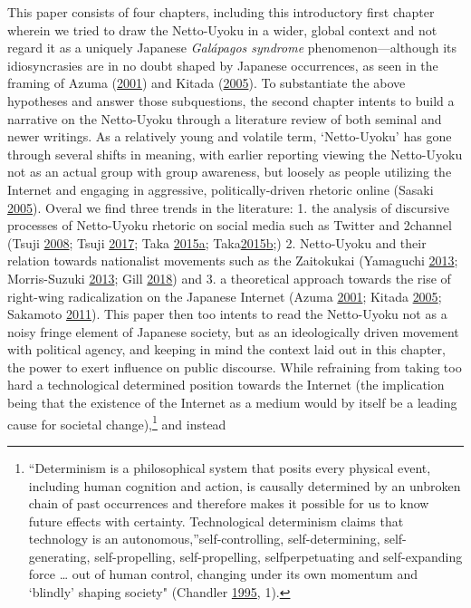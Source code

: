 \documentclass[10pt,british,A4paper,oneside]{memoir}
\begin{document}
This paper consists of four chapters, including this introductory first
chapter wherein we tried to draw the Netto-Uyoku in a wider, global
context and not regard it as a uniquely Japanese \emph{Galápagos
syndrome} phenomenon—although its idiosyncrasies are in no doubt shaped
by Japanese occurrences, as seen in the framing of Azuma
(\protect\hyperlink{ref-azuma_otaku:_2001}{2001}) and Kitada
(\protect\hyperlink{ref-kitada_eng:_2005}{2005}). To substantiate the above
hypotheses and answer those subquestions, the second chapter intents to
build a narrative on the Netto-Uyoku through a literature review of both
seminal and newer writings. As a relatively young and volatile term,
`Netto-Uyoku' has gone through several shifts in meaning, with earlier
reporting viewing the Netto-Uyoku not as an actual group with group
awareness, but loosely as people utilizing the Internet and engaging in
aggressive, politically-driven rhetoric online (Sasaki
\protect\hyperlink{ref-sasaki_netto-uyoku_2005}{2005}). Overal we find
three trends in the literature: 1. the analysis of discursive processes
of Netto-Uyoku rhetoric on social media such as Twitter and 2channel {(}Tsuji
\protect\hyperlink{ref-tsuji_eng:_2008}{2008}; Tsuji \protect\hyperlink{ref-tsuji_eng._2017}{2017};
Taka \protect\hyperlink{ref-taka_twitter_2015}{2015}\protect\hyperlink{ref-taka_twitter_2015}{a};
Taka\protect\hyperlink{ref-taka_twitter_2015-1}{2015}\protect\hyperlink{ref-taka_twitter_2015-1}{b};{)} 2. Netto-Uyoku and
their relation towards nationalist movements such as the Zaitokukai
(Yamaguchi \protect\hyperlink{ref-yamaguchi_xenophobia_2013}{2013};
Morris-Suzuki \protect\hyperlink{ref-morris-suzuki_freedom_2013}{2013};
Gill \protect\hyperlink{ref-gill_nativist_2018}{2018}) and 3. a
theoretical approach towards the rise of right-wing radicalization on
the Japanese Internet (Azuma
\protect\hyperlink{ref-azuma_otaku:_2001}{2001}; Kitada
\protect\hyperlink{ref-kitada_eng:_2005}{2005}; Sakamoto
\protect\hyperlink{ref-sakamoto_koreans_2011}{2011}). This paper then
too intents to read the Netto-Uyoku not as a noisy fringe element of
Japanese society, but as an ideologically driven movement with political
agency, and keeping in mind the context laid out in this chapter, the
power to exert influence on public discourse. While refraining from
taking too hard a technological determined position towards the Internet
(the implication being that the existence of the Internet as a medium
would by itself be a leading cause for societal change),\footnote{``Determinism
  is a philosophical system that posits every physical event, including
  human cognition and action, is causally determined by an unbroken
  chain of past occurrences and therefore makes it possible for us to
  know future effects with certainty. Technological determinism claims
  that technology is an autonomous,''self-controlling, self-determining,
  self-generating, self-propelling, self-propelling, selfperpetuating
  and self-expanding force \ldots{} out of human control, changing under
  its own momentum and `blindly' shaping society" (Chandler
  \protect\hyperlink{ref-chandler_act_1995}{1995}, 1).} and instead
\end{document}
